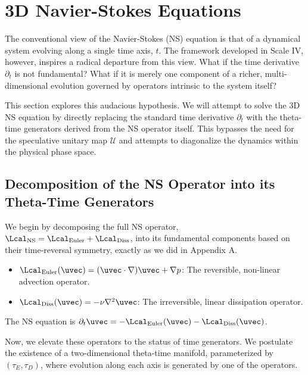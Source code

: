 
\section{3D Navier-Stokes Equations}
The conventional view of the Navier-Stokes (NS) equation is that of a dynamical system evolving along a single time axis, $t$. The framework developed in Scale IV, however, inspires a radical departure from this view. What if the time derivative $\partial_t$ is not fundamental? What if it is merely one component of a richer, multi-dimensional evolution governed by operators intrinsic to the system itself?

This section explores this audacious hypothesis. We will attempt to solve the 3D NS equation by directly replacing the standard time derivative $\partial_t$ with the theta-time generators derived from the NS operator itself. This bypasses the need for the speculative unitary map $\mathcal{U}$ and attempts to diagonalize the dynamics within the physical phase space.

\subsection{Decomposition of the NS Operator into its Theta-Time Generators}

We begin by decomposing the full NS operator, $\Lcal_{\text{NS}} = \Lcal_{\text{Euler}} + \Lcal_{\text{Diss}}$, into its fundamental components based on their time-reversal symmetry, exactly as we did in Appendix A.
\begin{itemize}
    \item $\Lcal_{\text{Euler}}(\uvec) = (\uvec \cdot \nabla)\uvec + \nabla p$: The reversible, non-linear advection operator.
    \item $\Lcal_{\text{Diss}}(\uvec) = -\nu \nabla^2 \uvec$: The irreversible, linear dissipation operator.
\end{itemize}
The NS equation is $\partial_t \uvec = -\Lcal_{\text{Euler}}(\uvec) - \Lcal_{\text{Diss}}(\uvec)$.

Now, we elevate these operators to the status of time generators. We postulate the existence of a two-dimensional theta-time manifold, parameterized by $(\tau_E, \tau_D)$, where evolution along each axis is generated by one of the operators.

